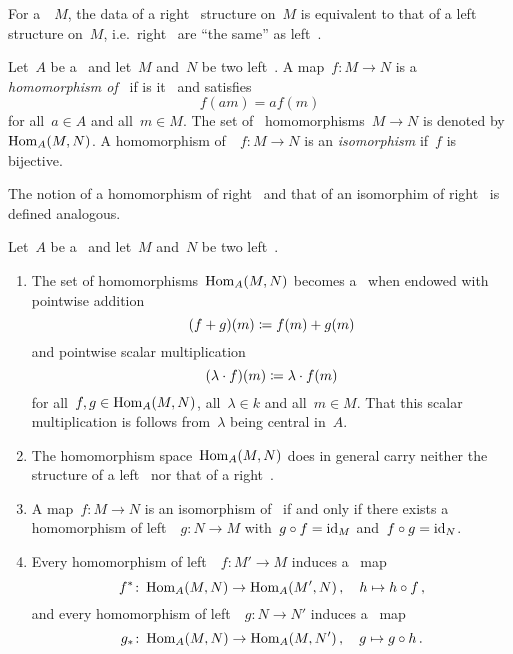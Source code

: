 \begin{remark}
  For a~{\module{$\kf$}}~$M$, the data of a right~{} structure on~$M$ is equivalent to that of a left~{} structure on~$M$, i.e.\ right~{} are \enquote{the same} as left~{}.
\end{remark}


\begin{definition}
  Let~$A$ be a~{\kalg} and let~$M$ and~$N$ be two left~{}.
  A map~$f \colon M \to N$ is a \emph{homomorphism of~{}} if is it~{\klin} and satisfies
  \[
      f(am)
    = a f(m)
  \]
  for all~$a \in A$ and all~$m \in M$.
  The set of~{} homomorphisms~$M \to N$ is denoted by~$\operatorname{Hom}_A(M,N)$.
  A homomorphism of~{}~$f \colon M \to N$ is an \emph{isomorphism} if~$f$ is bijective.
  
  The notion of a homomorphism of right~{} and that of an isomorphim of right~{} is defined analogous.
\end{definition}


\begin{remark}
  Let~$A$ be a~{\kalg} and let~$M$ and~$N$ be two left~{}.
  \begin{enumerate}
    \item
      The set of homomorphisms~$\operatorname{Hom}_A(M,N)$ becomes a~{\module{$\kf$}} when endowed with pointwise addition
      \[
                  (f + g)(m)
        \coloneqq  f(m) + g(m)
      \]
      and pointwise scalar multiplication
      \[
                  (\lambda \cdot f)(m)
        \coloneqq  \lambda \cdot f(m)
      \]
      for all~$f, g \in \operatorname{Hom}_A(M,N)$, all~$\lambda \in k$ and all~$m \in M$.
      That this scalar multiplication is {\welldef} follows from~$\lambda$ being central in~$A$.
    \item
      The homomorphism space~$\operatorname{Hom}_A(M,N)$ does in general carry neither the structure of a left~{} nor that of a right~{}.
    \item
      A map~$f \colon M \to N$ is an isomorphism of~{} if and only if there exists a homomorphism of left~{}~$g \colon N \to M$ with~$g \circ f = \operatorname{id}_M$ and~$f \circ g = \operatorname{id}_N$.
    \item
      Every homomorphism of left~{}~$f \colon M' \to M$ induces a~{\klin} map
      \[
                f^*
        \colon  \operatorname{Hom}_A(M, N)
        \to     \operatorname{Hom}_A(M', N) \,,
        \quad   h
        \mapsto h \circ f \,,
      \]
      and every homomorphism of left~{}~$g \colon N \to N'$ induces a~{\klin} map
      \[
                g_*
        \colon  \operatorname{Hom}_A(M, N)
        \to     \operatorname{Hom}_A(M, N') \,,
        \quad   g
        \mapsto g \circ h \,.
      \]
  \end{enumerate}
\end{remark}


